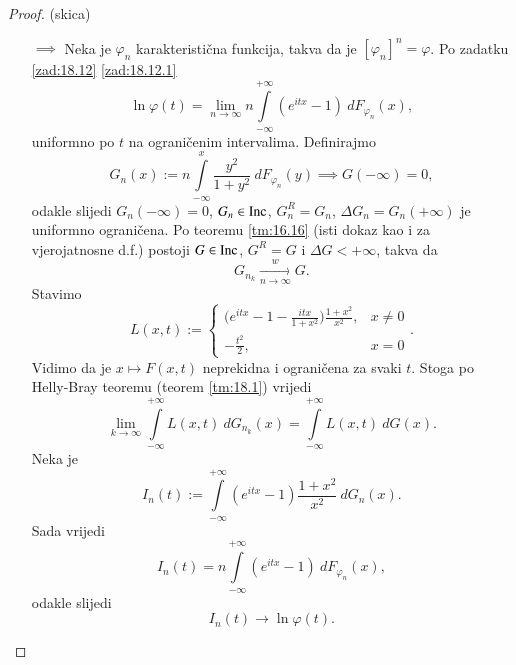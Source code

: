 \begin{proof}{(skica)}
    \begin{enumerate}
        \item[$\implies$]
        Neka je $\varphi_n$ karakteristi\v cna funkcija, takva da je $[\varphi_n]^n = \varphi$.
        Po zadatku \ref{zad:18.12} \ref{zad:18.12.1}
        \begin{equation*}
            \ln \varphi (t) = \lim\limits_{n \to \infty} n \int\limits_{-\infty}^{+\infty} (e^{itx} - 1) \: d F_{\varphi_n} (x),
        \end{equation*}
        uniformno po $t$ na ograni\v cenim intervalima.
        Definirajmo
        \begin{equation*}
            G_n (x) := n \int\limits_{-\infty}^x \frac{y^2}{1 + y^2} \: d F_{\varphi_n} (y) \implies G(-\infty) = 0,
        \end{equation*}
        odakle slijedi $G_n(-\infty) = 0$, $G_n \in \mathrm{Inc}$, $G_n^R = G_n$, $\Delta G_n = G_n (+\infty)$ je uniformno ograničena.
        Po teoremu \ref{tm:16.16} (isti dokaz kao i za vjerojatnosne d.f.) postoji $G \in \mathrm{Inc}$, $G^R = G$ i $\Delta G < +\infty$, takva da
        \begin{equation*}
            G_{n_k} \xrightarrow[n \to \infty]{w} G.
        \end{equation*}
        Stavimo
        \begin{equation*}
            L(x, t) :=
            \begin{cases}
                \big( e^{itx} - 1 - \frac{itx}{1 + x^2} \big) \frac{1 + x^2}{x^2}, &x \neq 0\\
                -\frac{t^2}{2}, &x = 0
            \end{cases}.
        \end{equation*}
        Vidimo da je $x \mapsto F(x, t)$ neprekidna i ograni\v cena za svaki $t$.
        Stoga po Helly-Bray teoremu (teorem \ref{tm:18.1}) vrijedi
        \begin{equation*}
            \lim\limits_{k \to \infty} \int\limits_{-\infty}^{+\infty} L(x, t) \: d G_{n_k} (x) = \int\limits_{-\infty}^{+\infty} L(x, t) \: d G(x).
        \end{equation*}
        Neka je
        \begin{equation*}
            I_n(t) := \int\limits_{-\infty}^{+\infty} (e^{itx} - 1) \frac{1 + x^2}{x^2} \: d G_n (x).
        \end{equation*}
        Sada vrijedi
        \begin{equation*}
            I_n (t) = n \int\limits_{-\infty}^{+\infty} (e^{itx} - 1) \: d F_{\varphi_n} (x),
        \end{equation*}
        odakle slijedi
        \begin{equation*}
            I_n (t) \to \ln \varphi (t).
        \end{equation*}


\end{enumerate}
\end{proof}

